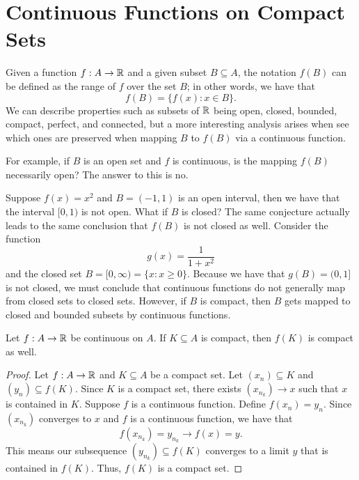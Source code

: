 

\section{Continuous Functions on Compact Sets}

Given a function \( f: A \to \mathbb{R}  \) and a given subset \( B \subseteq A  \), the notation \( f(B) \) can be defined as the range of \( f \) over the set \( B  \); in other words, we have that 
\[  f(B) = \{ f(x) : x \in B  \}.  \]
We can describe properties such as subsets of \( \mathbb{R}  \) being open, closed, bounded, compact, perfect, and connected, but a more interesting analysis arises when see which ones are preserved when mapping \( B  \) to \( f(B) \) via a continuous function. 

For example, if \( B  \) is an open set and \( f \) is continuous, is the mapping \( f(B) \) necessarily open? The answer to this is no.  

Suppose \( f(x) =x^2  \) and \( B = (-1,1) \) is an open interval, then we have that the interval \( [0,1) \) is not open. What if \( B  \) is closed? The same conjecture actually leads to the same conclusion that \( f(B) \) is not closed as well. Consider the function
\[  g(x) = \frac{ 1 }{ 1 + x^2  }   \]
and the closed set \( B = [0, \infty ) = \{ x : x \geq 0  \}  \). Because we have that \( g(B) = (0,1] \) is not closed, we must conclude that continuous functions do not generally map from closed sets to closed sets. However, if \( B  \) is compact, then \( B  \) gets mapped to closed and bounded subsets by continuous functions.

\begin{theorem}
    Let \( f: A \to \mathbb{R}  \) be continuous on \( A  \). If \( K \subseteq A  \) is compact, then \( f(K)  \) is compact as well.
    \end{theorem}

\begin{proof}
    Let \(  f: A \to \mathbb{R}  \) and \( K \subseteq A  \) be a compact set. Let \( (x_n) \subseteq K \) and \( (y_n) \subseteq f(K) \). Since \( K  \) is a compact set, there exists \( (x_{n_k}) \to x  \) such that \( x  \) is contained in \( K  \). Suppose \( f  \) is a continuous function. Define \( f(x_n) = y_n \). Since \( (x_{n_k}) \) converges to \( x  \) and \( f  \) is a continuous function, we have that 
    \[  f(x_{n_k}) = y_{n_k} \to f(x) = y. \]
    This means our subsequence \( (y_{n_k}) \subseteq f(K) \) converges to a limit \( y \) that is contained in \( f(K) \). Thus, \( f(K)  \) is a compact set.
\end{proof}

